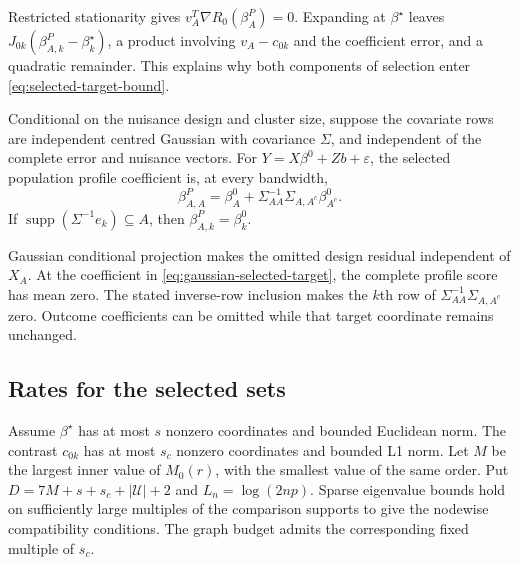 Restricted stationarity gives $v_A^T\nabla R_0(\beta_A^P)=0$.
Expanding at $\beta^\star$ leaves
$J_{0k}(\beta_{A,k}^P-\beta_k^\star)$, a product involving
$v_A-c_{0k}$ and the coefficient error, and a quadratic remainder.
This explains why both components of selection enter
\eqref{eq:selected-target-bound}.

\begin{proposition}\label{prop:gaussian-target}
Conditional on the nuisance design and cluster size, suppose the
covariate rows are independent centred Gaussian with covariance
$\Sigma$, and independent of the complete error and nuisance vectors.
For $Y=X\beta^0+Zb+\varepsilon$, the selected population profile
coefficient is, at every bandwidth,
\begin{equation}\label{eq:gaussian-selected-target}
 \beta_{A,A}^P=\beta_A^0+
                 \Sigma_{AA}^{-1}\Sigma_{A,A^c}\beta_{A^c}^0.
\end{equation}
If $\operatorname{supp}(\Sigma^{-1}e_k)\subseteq A$, then
$\beta_{A,k}^P=\beta_k^0$.
\end{proposition}

Gaussian conditional projection makes the omitted design residual
independent of $X_A$. At the coefficient in
\eqref{eq:gaussian-selected-target}, the complete profile score has
mean zero. The stated inverse-row inclusion makes the $k$th row of
$\Sigma_{AA}^{-1}\Sigma_{A,A^c}$ zero. Outcome coefficients can be
omitted while that target coordinate remains unchanged.

\subsection{Rates for the selected sets}\label{subsec:learning-rates}

Assume $\beta^\star$ has at most $s$ nonzero coordinates and bounded
Euclidean norm. The contrast $c_{0k}$ has at most $s_c$ nonzero
coordinates and bounded L1 norm. Let $M$ be the largest inner value
of $M_0(r)$, with the smallest value of the same order. Put
$D=7M+s+s_c+|\mathcal U|+2$ and $L_n=\log(2np)$.
Sparse eigenvalue bounds hold on sufficiently large multiples of the
comparison supports to give the nodewise compatibility conditions.
The graph budget admits the corresponding fixed multiple of $s_c$.

